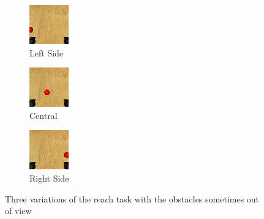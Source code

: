 \begin{figure}[htbp]
  \begin{subfigure}{0.3\linewidth}
    \centering
    \includegraphics[width=0.6\linewidth]{assets/cam-comb/reach-no-obs/initial-obs-side_l.png}      
    \caption{Left Side}
  \end{subfigure}
  \hfill
  \begin{subfigure}{0.3\textwidth}
    \centering
    \includegraphics[width=0.6\linewidth]{assets/cam-comb/reach-no-obs/initial-obs-central.png}
    \caption{Central}
  \end{subfigure}
  \hfill
  \begin{subfigure}{0.3\textwidth}
    \centering 
    \includegraphics[width=0.6\linewidth]{assets/cam-comb/reach-no-obs/initial-obs-side_r.png}
    \caption{Right Side}
  \end{subfigure}%
  \caption{Three variations of the reach task with the obstacles sometimes out of view}\label{fig:no-obs-3-views}
\end{figure}

